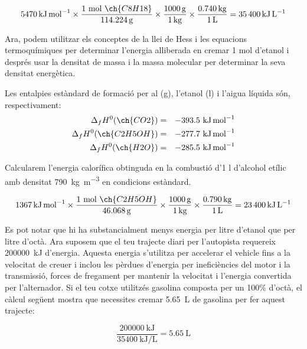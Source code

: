 \begin{equation*}
\qty{5470}{\kilo\joule\per\mole} \times \frac{1 \text{ mol } \ch{C8H18}}{\qty{114.224}{\gram}} \times \frac{\qty{1000}{\gram}}{\qty{1}{\kilo\gram}} \times \frac{\qty{0.740}{\kilo\gram}}{\qty{1}{\liter}} = \qty{35400}{\kilo\joule\per\liter}
\end{equation*}

Ara, podem utilitzar els conceptes de la llei de Hess i les equacions termoquímiques per determinar l'energia alliberada en cremar 1 mol d'etanol i després usar la densitat de massa i la massa molecular per determinar la seva densitat energètica.

Les entalpies estàndard de formació per al  (g), l'etanol (l) i l'aigua líquida són, respectivament:
\begin{eqnarray*}
\Delta_f H^0 (\ch{CO2}) &=& -393.5\ \si{\kilo\joule\per\mole}\\
\Delta_f H^0 (\ch{C2H5OH}) &=& -277.7\ \si{\kilo\joule\per\mole}\\
\Delta_f H^0 (\ch{H2O}) &=& -285.5\ \si{\kilo\joule\per\mole}
\end{eqnarray*}

Calcularem l'energia calorífica obtinguda en la combustió d'1 \si{\litre} d'alcohol etílic amb densitat \qty{790}{\kilo\gram\per\meter\cubed} en condicions estàndard.

\begin{equation*}
\qty{1367}{\kilo\joule\per\mole} \times \frac{1 \text{ mol } \ch{C2H5OH}}{\qty{46.068}{\gram}} \times \frac{\qty{1000}{\gram}}{\qty{1}{\kilo\gram}} \times \frac{\qty{0.790}{\kilo\gram}}{\qty{1}{\liter}} = \qty{23400}{\kilo\joule\per\liter}
\end{equation*}

Es pot notar que hi ha substancialment menys energia per litre d'etanol que per litre d'octà. Ara suposem que el teu trajecte diari per l'autopista requereix \qty{200000}{\kilo\joule} d'energia. Aquesta energia s'utilitza per accelerar el vehicle fins a la velocitat de creuer i inclou les pèrdues d'energia per ineficiències del motor i la transmissió, forces de fregament per mantenir la velocitat i l'energia convertida per l'alternador.
Si el teu cotxe utilitzés gasolina composta per un 100\% d'octà, el càlcul següent mostra que necessites cremar \qty{5.65}{\liter} de gasolina per fer aquest trajecte:

\begin{equation*}
\frac{\qty{200000}{\kilo\joule}}{\qty{35400}{\kilo\joule\per\liter}} = \qty{5.65}{\liter}
\end{equation*}

